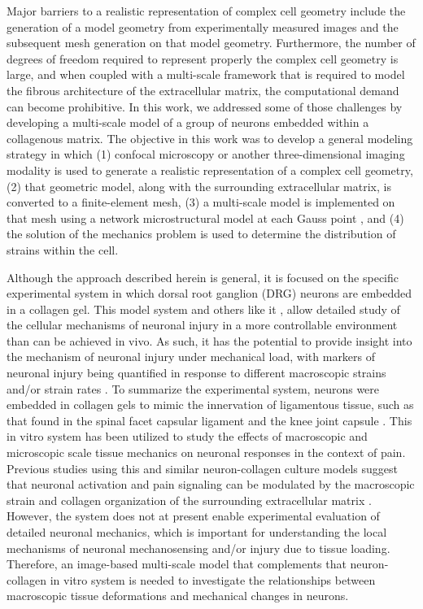 \documentclass[]{interact}
\begin{document}
Major barriers to a realistic representation of complex cell geometry include the generation of a model geometry from experimentally measured images and the subsequent mesh generation on that model geometry. Furthermore, the number of degrees of freedom required to represent properly the complex cell geometry is large, and when coupled with a multi-scale framework that is required to model the fibrous architecture of the extracellular matrix, the computational demand can become prohibitive. In this work, we addressed some of those challenges by developing a multi-scale model of a group of neurons embedded within a collagenous matrix. The objective in this work was to develop a general modeling strategy in which (1) confocal microscopy or another three-dimensional imaging modality is used to generate a realistic representation of a complex cell geometry, (2) that geometric model, along with the surrounding extracellular matrix, is converted to a finite-element mesh, (3) a multi-scale model is implemented on that mesh using a network microstructural model at each Gauss point \citep{Chandran:2007hy,Stylianopoulos:2007dp}, and (4) the solution of the mechanics problem is used to determine the distribution of strains within the cell. 

Although the approach described herein is general, it is focused on the specific experimental system in which dorsal root ganglion (DRG) neurons are embedded in a collagen gel. This model system and others like it  \citep{Zhang:2016ga,Zhang:2017gr,Zhang:2017kq}, allow detailed study of the cellular mechanisms of neuronal injury in a more controllable environment than can be achieved in vivo. As such, it has the potential to provide insight into the mechanism of neuronal injury under mechanical load, with markers of neuronal injury being quantified in response to different macroscopic strains and/or strain rates \citep{Zhang:2016ga}. To summarize the experimental system, neurons were embedded in collagen gels to mimic the innervation of ligamentous tissue, such as that found in the spinal facet capsular ligament \citep{McLain1998RF,Kallakuri:2012ib} and the knee joint capsule \citep{Schultz1984RA,Khalsa:CKPnLlfY}. This in vitro system has been utilized to study the effects of macroscopic and microscopic scale tissue mechanics on neuronal responses in the context of pain. Previous studies using this and similar neuron-collagen culture models suggest that neuronal activation and pain signaling can be modulated by the macroscopic strain and collagen organization of the surrounding extracellular matrix \citep{Zhang:2016ga, Zhang:2017gr}. However, the system does not at present enable experimental evaluation of detailed neuronal mechanics, which is important for understanding the local mechanisms of neuronal mechanosensing and/or injury due to tissue loading. Therefore, an image-based multi-scale model that complements that neuron-collagen in vitro system is needed to investigate the relationships between macroscopic tissue deformations and mechanical changes in neurons. 
\end{document}
